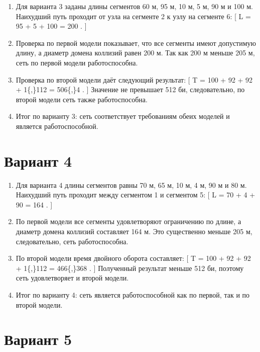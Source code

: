 \documentclass[
  english,
  russian,
  12pt,
  a4paper,
  DIV=11,
  numbers=noendperiod]{scrreprt}
\begin{document}
\begin{enumerate}
\def\labelenumi{\arabic{enumi}.}
\item
  Для варианта 3 заданы длины сегментов 60 м, 95 м, 10 м, 5 м, 90 м и
  100 м. Наихудший путь проходит от узла на сегменте 2 к узлу на
  сегменте 6: {[} L = 95 + 5 + 100 = 200 . {]}
\item
  Проверка по первой модели показывает, что все сегменты имеют
  допустимую длину, а диаметр домена коллизий равен 200 м. Так как 200 м
  меньше 205 м, сеть по первой модели работоспособна.
\item
  Проверка по второй модели даёт следующий результат: {[} T = 100 + 92 +
  92 + 1\{,\}112  = 506\{,\}4 . {]} Значение не
  превышает 512 би, следовательно, по второй модели сеть также
  работоспособна.
\item
  Итог по варианту 3: сеть соответствует требованиям обеих моделей и
  является работоспособной.
\end{enumerate}

\section{Вариант 4}\label{ux432ux430ux440ux438ux430ux43dux442-4}

\begin{enumerate}
\def\labelenumi{\arabic{enumi}.}
\item
  Для варианта 4 длины сегментов равны 70 м, 65 м, 10 м, 4 м, 90 м и 80
  м. Наихудший путь проходит между сегментом 1 и сегментом 5: {[} L = 70
  + 4 + 90 = 164 . {]}
\item
  По первой модели все сегменты удовлетворяют ограничению по длине, а
  диаметр домена коллизий составляет 164 м. Это существенно меньше 205
  м, следовательно, сеть работоспособна.
\item
  По второй модели время двойного оборота составляет: {[} T = 100 + 92 +
  92 + 1\{,\}112  = 466\{,\}368 . {]} Полученный
  результат меньше 512 би, поэтому сеть удовлетворяет и второй модели.
\item
  Итог по варианту 4: сеть является работоспособной как по первой, так и
  по второй модели.
\end{enumerate}

\section{Вариант 5}\label{ux432ux430ux440ux438ux430ux43dux442-5}
\end{document}
